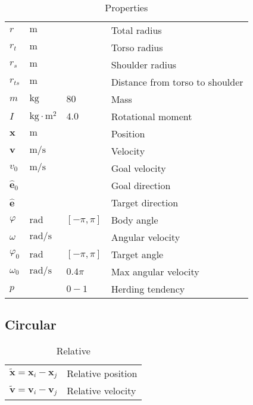 \begin{table}[H]
\begin{tabularx}{1.0\linewidth}{ l l l l }
\hline
\hline
$ r $                    & $ \mathrm{m} $ &  & Total radius \\
$ r_{t} $                & $ \mathrm{m} $ &  & Torso radius \\
$ r_{s} $                & $ \mathrm{m} $ &  & Shoulder radius \\
$ r_{ts} $                & $ \mathrm{m} $ &  & Distance from torso to shoulder \\
$ m $                    & $ \mathrm{kg} $ & $ 80 $ & Mass \\
$ I $                    & $ \mathrm{kg \cdot m^{2}} $ & $ 4.0 $ & Rotational moment \\
\hline
\hline
$ \mathbf{x} $           & $ \mathrm{m} $ &  & Position \\
$ \mathbf{v} $           & $ \mathrm{m} / \mathrm{s} $ &  & Velocity \\
$ v_{0} $                & $ \mathrm{m} / \mathrm{s} $ &  & Goal velocity \\  
$ \hat{\mathbf{e}}_{0} $ &  &  & Goal direction \\
$ \hat{\mathbf{e}} $     &  &  & Target direction \\
\hline
\hline
$ \varphi $              & $ \mathrm{rad} $ & $ [-\pi, \pi] $ & Body angle \\
$ \omega $               & $ \mathrm{rad} / \mathrm{s} $ &  & Angular velocity \\
$ \varphi_{0} $          & $ \mathrm{rad} $ & $ [-\pi, \pi] $ & Target angle \\
$ \omega_{0} $           & $ \mathrm{rad} / \mathrm{s} $ & $ 0.4\pi $ & Max angular velocity \\
\hline
\hline
$ p $                    &  & $ 0 - 1 $ & Herding tendency \\
\hline
\hline
\end{tabularx}
\caption{Properties}
\end{table}


\subsection{Circular}

\begin{table}[H]
\begin{tabularx}{1.0\linewidth}{ll}
\hline
\hline
$ \tilde{\mathbf{x}} = \mathbf{x}_{i} - \mathbf{x}_{j} $ & Relative position \\
$ \tilde{\mathbf{v}} = \mathbf{v}_{i} - \mathbf{v}_{j} $ & Relative velocity \\
\hline
\hline
\end{tabularx}
\caption{Relative}
\end{table}

